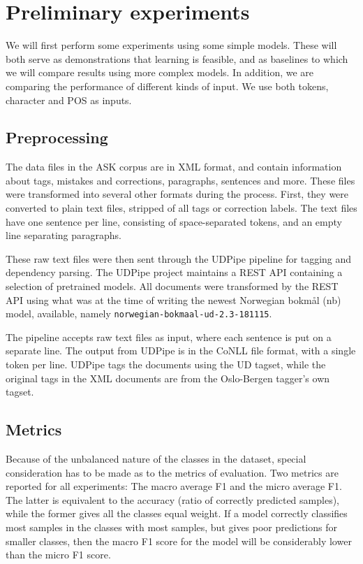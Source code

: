 \chapter{Preliminary experiments}

We will first perform some experiments using some simple models. These will
both serve as demonstrations that learning is feasible, and as baselines
to which we will compare results using more complex models. In addition,
we are comparing the performance of different kinds of input. We use both
tokens, character \ngrams and \ac{POS} \ngrams as inputs.


\section{Preprocessing}

The data files in the ASK corpus are in \ac{XML} format, and contain information
about tags, mistakes and corrections, paragraphs, sentences and more. These
files were transformed into several other formats during the process. First,
they were converted to plain text files, stripped of all tags or correction
labels. The text files have one sentence per line, consisting of
space-separated tokens, and an empty line separating paragraphs.

These raw text files were then sent through the UDPipe pipeline
\autocite{udpipe:2017} for tagging and dependency parsing. The UDPipe project
maintains a \ac{REST} \ac{API} containing a selection of pretrained models. All
documents were transformed by the \ac{REST} \ac{API} using what was at the time of
writing the newest Norwegian bokmål (nb) model, available, namely
\texttt{norwegian-bokmaal-ud-2.3-181115}.

The pipeline accepts raw text files as input, where each sentence is put on a
separate line. The output from UDPipe is in the CoNLL file format, with a
single token per line. UDPipe tags the documents using the UD tagset, while
the original tags in the \ac{XML} documents are from the Oslo-Bergen tagger's own
tagset.


\section{Metrics}

Because of the unbalanced nature of the classes in the dataset, special
consideration has to be made as to the metrics of evaluation. Two metrics are
reported for all experiments: The macro average F1 and the micro average F1.
The latter is equivalent to the accuracy (ratio of correctly predicted
samples), while the former gives all the classes equal weight. If a model
correctly classifies most samples in the classes with most samples, but gives
poor predictions for smaller classes, then the macro F1 score for the model
will be considerably lower than the micro F1 score.

